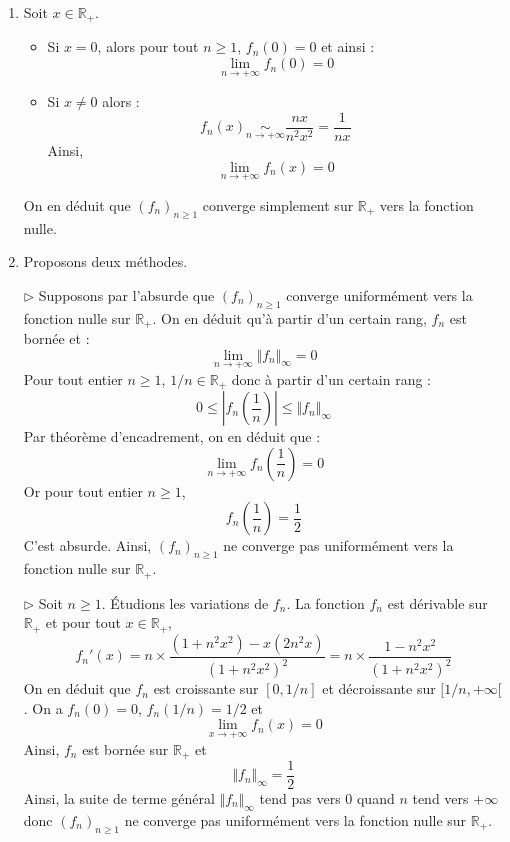 \documentclass[a4paper,10pt]{report}
\begin{document}
\corr 

\begin{enumerate}
\item Soit $x \in \mathbb{R}_+$.

\begin{itemize}
\item Si $x=0$, alors pour tout $n \geq 1$, $f_n(0)=0$ et ainsi :
$$ \lim_{n \rightarrow + \infty} f_n(0)=0$$
\item Si $x \neq 0$ alors :
$$ f_n(x) \underset{n \rightarrow + \infty}{\sim} \dfrac{nx}{n^2x^2} = \dfrac{1}{nx}$$
Ainsi,
$$ \lim_{n \rightarrow + \infty} f_n(x) = 0$$
\end{itemize}
On en déduit que $(f_n)_{n \geq 1}$ converge simplement sur $\mathbb{R}_+$ vers la fonction nulle.
\item Proposons deux méthodes.

\medskip

\noindent $\rhd$ Supposons par l'absurde que $(f_n)_{n \geq 1}$ converge uniformément vers la fonction nulle sur $\mathbb{R}_+$. On en déduit qu'à partir d'un certain rang, $f_n$ est bornée et :
$$ \lim_{n \rightarrow + \infty} \Vert f_n \Vert_{\infty} = 0$$
Pour tout entier $n \geq 1$, $1/n \in \mathbb{R}_+$ donc à partir d'un certain rang :
$$ 0 \leq \left\vert f_n \left( \dfrac{1}{n} \right) \right\vert \leq \Vert f_n \Vert_{\infty}$$
Par théorème d'encadrement, on en déduit que :
$$ \lim_{n \rightarrow + \infty} f_n \left( \dfrac{1}{n} \right) = 0$$
Or pour tout entier $n \geq 1$,
$$ f_n \left( \dfrac{1}{n} \right) = \dfrac{1}{2}$$
C'est absurde. Ainsi, $(f_n)_{n \geq 1}$ ne converge pas uniformément vers la fonction nulle sur $\mathbb{R}_+$.

\medskip

\noindent $\rhd$ Soit $n \geq 1$. Étudions les variations de $f_n$. La fonction $f_n$ est dérivable sur $\mathbb{R}_+$ et pour tout $x \in \mathbb{R}_+$,
$$ f_n'(x) = n \times \dfrac{(1+n^2x^2)-x(2n^2x)}{(1+n^2x^2)^2} = n \times \dfrac{1-n^2x^2}{(1+n^2x^2)^2}$$
On en déduit que $f_n$ est croissante sur $[0,1/n]$ et décroissante sur $[1/n, + \infty[$. On a $f_n(0)=0$, $f_n(1/n)=1/2$ et 
$$ \lim_{x \rightarrow + \infty} f_n(x) = 0$$
Ainsi, $f_n$ est bornée sur $\mathbb{R}_+$ et 
$$ \Vert f_n \Vert_{\infty} = \dfrac{1}{2}$$
Ainsi, la suite de terme général $\Vert f_n \Vert_{\infty}$ tend pas vers $0$ quand $n$ tend vers $+ \infty$ donc $(f_n)_{n \geq 1}$ ne converge pas uniformément vers la fonction nulle sur $\mathbb{R}_+$.

\medskip


\end{enumerate}
\end{document}
